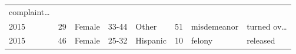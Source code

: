 \documentclass[]{article}
\begin{document}
\begin{longtable}[]{@{}llllllll@{}}
\begin{minipage}[t]{0.14\columnwidth}
complaint\ldots{}\strut
\end{minipage}\tabularnewline
\begin{minipage}[t]{0.06\columnwidth}\raggedright\strut
2015\strut
\end{minipage} & \begin{minipage}[t]{0.07\columnwidth}\raggedright\strut
29\strut
\end{minipage} & \begin{minipage}[t]{0.07\columnwidth}\raggedright\strut
Female\strut
\end{minipage} & \begin{minipage}[t]{0.07\columnwidth}\raggedright\strut
33-44\strut
\end{minipage} & \begin{minipage}[t]{0.16\columnwidth}\raggedright\strut
Other\strut
\end{minipage} & \begin{minipage}[t]{0.08\columnwidth}\raggedright\strut
51\strut
\end{minipage} & \begin{minipage}[t]{0.14\columnwidth}\raggedright\strut
misdemeanor\strut
\end{minipage} & \begin{minipage}[t]{0.14\columnwidth}\raggedright\strut
turned ov\ldots{}\strut
\end{minipage}\tabularnewline
\begin{minipage}[t]{0.06\columnwidth}\raggedright\strut
2015\strut
\end{minipage} & \begin{minipage}[t]{0.07\columnwidth}\raggedright\strut
46\strut
\end{minipage} & \begin{minipage}[t]{0.07\columnwidth}\raggedright\strut
Female\strut
\end{minipage} & \begin{minipage}[t]{0.07\columnwidth}\raggedright\strut
25-32\strut
\end{minipage} & \begin{minipage}[t]{0.16\columnwidth}\raggedright\strut
Hispanic\strut
\end{minipage} & \begin{minipage}[t]{0.08\columnwidth}\raggedright\strut
10\strut
\end{minipage} & \begin{minipage}[t]{0.14\columnwidth}\raggedright\strut
felony\strut
\end{minipage} & \begin{minipage}[t]{0.14\columnwidth}\raggedright\strut
released\strut
\end{minipage}\tabularnewline
\bottomrule
\end{longtable}
\end{document}
